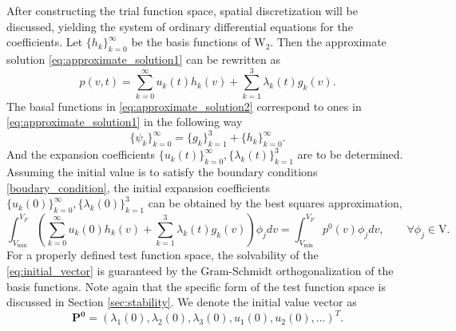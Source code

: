 After constructing the trial function space, spatial discretization will be discussed, yielding the system of ordinary differential equations for the coefficients. Let $\{h_k\}_{k=0}^{\infty}$ be the basis functions of $\mathrm{W}_2$. Then the approximate solution \eqref{eq:approximate_solution1} can be rewritten as
\begin{equation}
    \label{eq:approximate_solution2}
    p(v,t)=\sum_{k=0}^{\infty}u_k(t)h_k(v)+\sum_{k=1}^3\lambda_k(t)g_k(v).
\end{equation}
The basal functions in \eqref{eq:approximate_solution2} correspond to ones in \eqref{eq:approximate_solution1} in the following way
\begin{equation}
    \{\psi_k\}_{k=0}^{\infty}=\{g_k\}_{k=1}^{3}+\{h_k\}_{k=0}^{\infty}.
\end{equation}
And the expansion coefficients $\{u_k(t)\}_{k=0}^{\infty},\{\lambda_k(t)\}_{k=1}^3$ are to be determined.
Assuming the initial value is to satisfy the boundary conditions \eqref{boudary_condition}, the initial expansion coefficients $\{u_k(0)\}_{k=0}^{\infty},\{\lambda_k(0)\}_{k=1}^3$ can be obtained by the best squares approximation,
\begin{equation}
    \label{eq:initial_vector}
    \int_{V_{\min}}^{V_F} \left(\sum_{k=0}^{\infty}u_k(0)h_k(v)+\sum_{k=1}^3\lambda_k(t)g_k(v)\right) \phi_j dv=\int_{V_{\min}}^{V_F} p^0(v)\phi_j dv, \qquad \forall \phi_j \in \mathrm{V}.
\end{equation}
For a properly defined test function space, the solvability of the \eqref{eq:initial_vector} is guaranteed by the Gram-Schmidt orthogonalization of the basis functions. Note again that the specific form of the test function space is discussed in Section \ref{sec:stability}. We denote the initial value vector as
\begin{equation}
    \label{eq:initial_value}
    \mathbf{P^0}=(\lambda_1(0),\lambda_2(0),\lambda_3(0),u_1(0),u_2(0),...)^T.
\end{equation}

